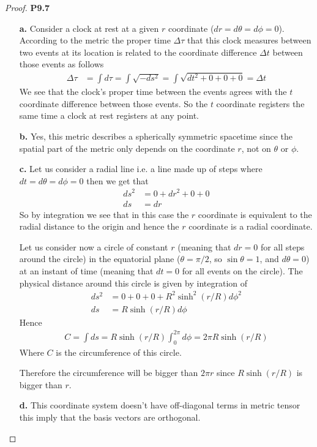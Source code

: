 \documentclass[11pt]{article}
\theoremstyle{definition}
\begin{document}
\cleardoublepage
\begin{proof}{\textbf{P9.7}}
\begin{itemize}
    \item [\textbf{a.}] Consider a clock at rest at a given $r$ coordinate
    ($dr = d\theta = d\phi = 0$). According to the metric the proper time
    $\Delta \tau$ that this clock measures between two events at its location
    is related to the coordinate difference $\Delta t$ between those events
    as follows
    \begin{align*}
        \Delta \tau &= \int d\tau = \int \sqrt{-ds^2}
        = \int \sqrt{dt^2 + 0 + 0 + 0}
        = \Delta t 
    \end{align*}
    We see that the clock's proper time between the events agrees with the $t$
    coordinate difference between those events.
    So the $t$ coordinate registers the same time a clock at rest registers at
    any point.

    \item [\textbf{b.}] Yes, this metric describes a spherically symmetric
    spacetime since the spatial part of the metric only depends on the
    coordinate $r$, not on $\theta$ or $\phi$.
    
    \item [\textbf{c.}]
    Let us consider a radial line i.e. a line made up of steps where
    $dt = d\theta = d\phi = 0$ then we get that
    \begin{align*}
        ds^2 &= 0 + dr^2 + 0 + 0\\
        ds &= dr
    \end{align*}
    So by integration we see that in this case the $r$ coordinate is equivalent
    to the radial distance to the origin and hence the $r$ coordinate is a
    radial coordinate.

    Let us consider now a circle of constant $r$
    (meaning that $dr = 0$ for all steps around the circle) in the equatorial
    plane ($\theta = \pi/2$, so $\sin\theta = 1$, and $d\theta = 0$)
    at an instant of time (meaning that $dt = 0$ for all events on the circle).
    The physical distance around this circle is given by integration of
    \begin{align*}
        ds^2 &= 0 + 0 + 0 + R^2\sinh^2(r/R)d\phi^2\\
        ds &= R\sinh(r/R)d\phi
    \end{align*}
    Hence
    \begin{align*}
        C = \int ds = R\sinh(r/R)\int_0^{2\pi}d\phi
        = 2\pi R\sinh(r/R)
    \end{align*}
    Where $C$ is the circumference of this circle.

    Therefore the circumference will be bigger than $2\pi r$
    since $R\sinh(r/R)$ is bigger than $r$.

    \item [\textbf{d.}] This coordinate system doesn't have off-diagonal terms
    in metric tensor this imply that the basis vectors are orthogonal.
\end{itemize}
\end{proof}
\end{document}

